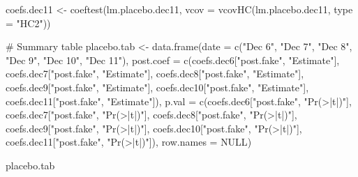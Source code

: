 \documentclass[
  letterpaper,
  DIV=11,
  numbers=noendperiod]{scrartcl}
\newenvironment{Shaded}{\begin{snugshade}}{\end{snugshade}}
\newcommand{\AttributeTok}[1]{\textcolor[rgb]{0.40,0.45,0.13}{#1}}
\newcommand{\CommentTok}[1]{\textcolor[rgb]{0.37,0.37,0.37}{#1}}
\newcommand{\ConstantTok}[1]{\textcolor[rgb]{0.56,0.35,0.01}{#1}}
\newcommand{\FunctionTok}[1]{\textcolor[rgb]{0.28,0.35,0.67}{#1}}
\newcommand{\NormalTok}[1]{\textcolor[rgb]{0.00,0.23,0.31}{#1}}
\newcommand{\OtherTok}[1]{\textcolor[rgb]{0.00,0.23,0.31}{#1}}
\newcommand{\StringTok}[1]{\textcolor[rgb]{0.13,0.47,0.30}{#1}}
\begin{document}
\begin{Shaded}
\begin{Highlighting}[]
\NormalTok{coefs.dec11 }\OtherTok{\textless{}{-}} \FunctionTok{coeftest}\NormalTok{(lm.placebo.dec11, }\AttributeTok{vcov =} \FunctionTok{vcovHC}\NormalTok{(lm.placebo.dec11, }\AttributeTok{type =} \StringTok{"HC2"}\NormalTok{))}

\CommentTok{\# Summary table}
\NormalTok{placebo.tab }\OtherTok{\textless{}{-}} \FunctionTok{data.frame}\NormalTok{(}\AttributeTok{date =} \FunctionTok{c}\NormalTok{(}\StringTok{"Dec 6"}\NormalTok{, }\StringTok{"Dec 7"}\NormalTok{, }\StringTok{"Dec 8"}\NormalTok{, }\StringTok{"Dec 9"}\NormalTok{, }\StringTok{"Dec 10"}\NormalTok{, }\StringTok{"Dec 11"}\NormalTok{),}
                          \AttributeTok{post.coef =} \FunctionTok{c}\NormalTok{(coefs.dec6[}\StringTok{"post.fake"}\NormalTok{, }\StringTok{"Estimate"}\NormalTok{],}
\NormalTok{                                        coefs.dec7[}\StringTok{"post.fake"}\NormalTok{, }\StringTok{"Estimate"}\NormalTok{],}
\NormalTok{                                        coefs.dec8[}\StringTok{"post.fake"}\NormalTok{, }\StringTok{"Estimate"}\NormalTok{],}
\NormalTok{                                        coefs.dec9[}\StringTok{"post.fake"}\NormalTok{, }\StringTok{"Estimate"}\NormalTok{],}
\NormalTok{                                        coefs.dec10[}\StringTok{"post.fake"}\NormalTok{, }\StringTok{"Estimate"}\NormalTok{],}
\NormalTok{                                        coefs.dec11[}\StringTok{"post.fake"}\NormalTok{, }\StringTok{"Estimate"}\NormalTok{]),}
                          \AttributeTok{p.val =} \FunctionTok{c}\NormalTok{(coefs.dec6[}\StringTok{"post.fake"}\NormalTok{, }\StringTok{"Pr(\textgreater{}|t|)"}\NormalTok{],}
\NormalTok{                                    coefs.dec7[}\StringTok{"post.fake"}\NormalTok{, }\StringTok{"Pr(\textgreater{}|t|)"}\NormalTok{],}
\NormalTok{                                    coefs.dec8[}\StringTok{"post.fake"}\NormalTok{, }\StringTok{"Pr(\textgreater{}|t|)"}\NormalTok{],}
\NormalTok{                                    coefs.dec9[}\StringTok{"post.fake"}\NormalTok{, }\StringTok{"Pr(\textgreater{}|t|)"}\NormalTok{],}
\NormalTok{                                    coefs.dec10[}\StringTok{"post.fake"}\NormalTok{, }\StringTok{"Pr(\textgreater{}|t|)"}\NormalTok{],}
\NormalTok{                                    coefs.dec11[}\StringTok{"post.fake"}\NormalTok{, }\StringTok{"Pr(\textgreater{}|t|)"}\NormalTok{]),}
                          \AttributeTok{row.names =} \ConstantTok{NULL}\NormalTok{)}

\NormalTok{placebo.tab}
\end{Highlighting}
\end{Shaded}
\end{document}
